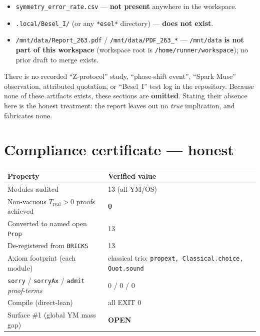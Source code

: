 \documentclass[11pt]{article}
\newcommand{\OPEN}{\textbf{\textsf{OPEN}}}
\begin{document}
\begin{itemize}
  \item \texttt{symmetry\_error\_rate.csv} --- \textbf{not present} anywhere in
        the workspace.
  \item \texttt{.local/Besel\_I/} (or any \texttt{*esel*} directory) ---
        \textbf{does not exist}.
  \item \texttt{/mnt/data/Report\_263.pdf} / \texttt{/mnt/data/PDF\_263\_*} ---
        \texttt{/mnt/data} \textbf{is not part of this workspace}
        (workspace root is \texttt{/home/runner/workspace}); no prior draft to
        merge exists.
\end{itemize}

There is no recorded ``Z-protocol'' study, ``phase-shift event'', ``Spark Muse''
observation, attributed quotation, or ``Besel~I'' test log in the repository.
Because none of these artifacts exists, these sections are \textbf{omitted}.
Stating their absence here is the honest treatment: the report leaves out no
\emph{true} implication, and fabricates none.
\clearpage
\section{Compliance certificate --- honest}
\label{sec:compliance}

\begin{longtable}{@{}p{6.2cm} p{8.5cm}@{}}
\toprule
Property & Verified value \\
\midrule
Modules audited & 13 (all YM/OS) \\
Non-vacuous $T_{\mathrm{real}}>0$ proofs achieved & \textbf{0} \\
Converted to named open \texttt{Prop} & 13 \\
De-registered from \texttt{BRICKS} & 13 \\
Axiom footprint (each module) & classical trio: \texttt{propext, Classical.choice, Quot.sound} \\
\texttt{sorry} / \texttt{sorryAx} / \texttt{admit} \emph{proof-terms} & 0 / 0 / 0 \\
Compile (direct-lean) & all EXIT 0 \\
Surface \#1 (global YM mass gap) & \OPEN{} \\
\bottomrule
\end{longtable}
\end{document}
